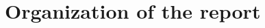\documentclass[a4paper,12pt]{article}
\def\baselinestretch{1.15}
\begin{document}












{}

\section{Organization of the report}
\end{document}
